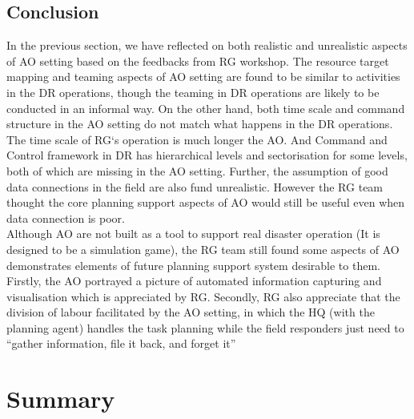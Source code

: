 \subsection{Conclusion}
In the previous section, we have reflected on both realistic and unrealistic aspects of AO setting based on the feedbacks from RG workshop. The resource target mapping and teaming aspects of AO setting are found to be similar to activities in the DR operations, though the teaming in DR operations are likely to be conducted in an informal way. On the other hand, both time scale and command structure in the AO setting do not match what happens in the DR operations. The time scale of RG`s operation is much longer the AO. And Command and Control framework in DR has hierarchical levels and sectorisation for some levels, both of which are missing in the AO setting. Further, the assumption of good data connections in the field are also fund unrealistic. However the RG team thought the core planning support aspects of AO would still be useful even when data connection is poor. \\

Although AO are not built as a tool to support real disaster operation (It is designed to be a simulation game), the RG team still found some aspects of AO demonstrates elements of future planning support system desirable to them. Firstly, the AO portrayed a picture of automated information capturing and visualisation which is appreciated by RG. Secondly, RG also appreciate that the division of labour facilitated by the AO setting, in which the HQ (with the planning agent) handles the task planning while the field responders just need to ``gather information, file it back, and forget it''\\

\section{Summary}





